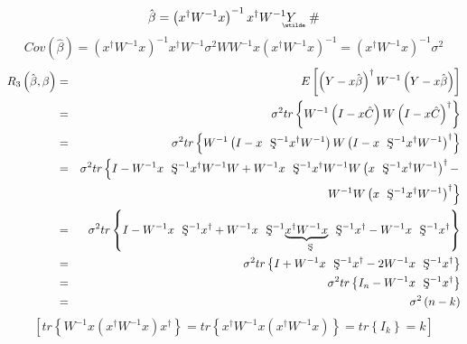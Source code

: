 \documentclass{article}
\begin{document}
\begin{equation*}
\therefore \hat{\beta}=\left( x^{\dagger }W^{-1}x\right) ^{-1}x^{\dagger
}W^{-1}%
\underaccent{\wtilde}{Y}%
\quad \#
\end{equation*}%
\begin{equation*}
Cov\left( \hat{\beta}\right) =\left( x^{\dagger }W^{-1}x\right)
^{-1}x^{\dagger }W^{-1}\sigma ^{2}WW^{-1}x\left( x^{\dagger }W^{-1}x\right)
^{-1}=\left( x^{\dagger }W^{-1}x\right) ^{-1}\sigma ^{2}
\end{equation*}%
\begin{eqnarray*}
R_{3}\left( \hat{\beta},\beta \right)  &=&E\left[ \left( Y-x\hat{\beta}%
\right) ^{\dagger }W^{-1}\left( Y-x\hat{\beta}\right) \right]  \\
&=&\sigma ^{2}tr\left\{ W^{-1}\left( I-x\hat{C}\right) W\left( I-x\hat{C}%
\right) ^{\dagger }\right\}  \\
&=&\sigma ^{2}tr\left\{ W^{-1}\left( I-x\text{\c{S}}^{-1}x^{\dagger
}W^{-1}\right) W\left( I-x\text{\c{S}}^{-1}x^{\dagger }W^{-1}\right)
^{\dagger }\right\}  \\
&=&\sigma ^{2}tr\left\{ I-W^{-1}x\text{\c{S}}^{-1}x^{\dagger }W^{-1}W+W^{-1}x%
\text{\c{S}}^{-1}x^{\dagger }W^{-1}W\left( x\text{\c{S}}^{-1}x^{\dagger
}W^{-1}\right) ^{\dagger }-\right.  \\
&&\left. W^{-1}W\left( x\text{\c{S}}^{-1}x^{\dagger }W^{-1}\right) ^{\dagger
}\right\}  \\
&=&\sigma ^{2}tr\left\{ I-W^{-1}x\text{\c{S}}^{-1}x^{\dagger }+W^{-1}x\text{%
\c{S}}^{-1}\underset{\text{\c{S}}}{\underbrace{x^{\dagger }W^{-1}x}}\text{\c{%
S}}^{-1}x^{\dagger }-W^{-1}x\text{\c{S}}^{-1}x^{\dagger }\right\}  \\
&=&\sigma ^{2}tr\left\{ I+W^{-1}x\text{\c{S}}^{-1}x^{\dagger }-2W^{-1}x\text{%
\c{S}}^{-1}x^{\dagger }\right\}  \\
&=&\sigma ^{2}tr\left\{ I_{n}-W^{-1}x\text{\c{S}}^{-1}x^{\dagger }\right\} 
\\
&=&\sigma ^{2}\left( n-k\right) 
\end{eqnarray*}%
\begin{equation*}
\left[ tr\left\{ W^{-1}x\left( x^{\dagger }W^{-1}x\right) x^{\dagger
}\right\} =tr\left\{ x^{\dagger }W^{-1}x\left( x^{\dagger }W^{-1}x\right)
\right\} =tr\left\{ I_{k}\right\} =k\right] 
\end{equation*}

\bigskip
\end{document}
